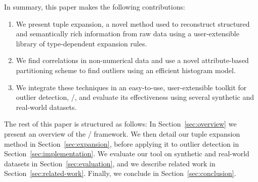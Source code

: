 In summary, this paper makes the following contributions:
\begin{enumerate}
\item We present tuple expansion, a novel method used to reconstruct structured and semantically rich information from raw data using a user-extensible library of type-dependent expansion rules.
\item We find correlations in non-numerical data and use a novel attribute-based partitioning scheme to find outliers using an efficient histogram model.
\item We integrate these techniques in an easy-to-use, user-extensible toolkit for outlier detection, \dBoost/, and evaluate its effectiveness using several synthetic and real-world datasets.
\end{enumerate}

The rest of this paper is structured as follows: In Section~\ref{sec:overview} we present an overview of the \dBoost/ framework. We then detail our tuple expansion method in Section~\ref{sec:expansion}, before applying it to outlier detection in Section~\ref{sec:implementation}. We evaluate our tool on synthetic and real-world datasets in Section~\ref{sec:evaluation}, and we describe related work in Section~\ref{sec:related-work}. Finally, we conclude in Section~\ref{sec:conclusion}. %
